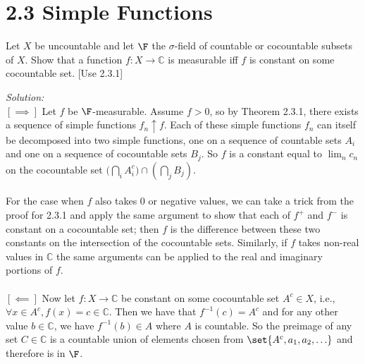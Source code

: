 \section*{2.3 Simple Functions}
\begin{problem}[2.33]\label{pr}
    Let $X$ be uncountable and let $\F$ the $\sigma$-field of countable or cocountable subsets of $X$. Show that a function $f : X \rightarrow \mathbb{C}$ is measurable iff $f$ is constant on some cocountable set. [Use 2.3.1]
\end{problem}

\noindent\textit{Solution:} \\
    $[\implies]$ Let $f$ be $\F$-measurable. Assume $f > 0$, so by Theorem 2.3.1, there exists a sequence of simple functions $f_n \uparrow f$. Each of these simple functions $f_n$ can itself be decomposed into two simple functions, one on a sequence of countable sets $A_i$ and one on a sequence of cocountable sets $B_j$. So $f$ is a constant equal to $\lim_{n} c_n$ on the cocountable set $\Big(\bigcap_i A_i^c\Big) \cap \left(\bigcap_j B_j\right)$.\\
    \\
    For the case when $f$ also takes $0$ or negative values, we can take a trick from the proof for 2.3.1 and apply the same argument to show that each of $f^+$ and $f^-$ is constant on a cocountable set; then $f$ is the difference between these two constants on the intersection of the cocountable sets. Similarly, if $f$ takes non-real values in $\mathbb{C}$ the same arguments can be applied to the real and imaginary portions of $f$. \\
    \\
    $[\impliedby]$ Now let $f : X \rightarrow \mathbb{C}$ be constant on some cocountable set $A^c \in X$, i.e., $\forall x \in A^c, f(x) = c \in \mathbb{C}$. Then we have that $f^{-1}(c) = A^c$ and for any other value $b \in \mathbb{C}$, we have $f^{-1}(b) \in A$ where $A$ is countable. So the preimage of any set $C \in \mathbb{C}$ is a countable union of elements chosen from $\set{A^c, a_1, a_2, \ldots}$ and therefore is in $\F$.
    
\vspace{10mm}